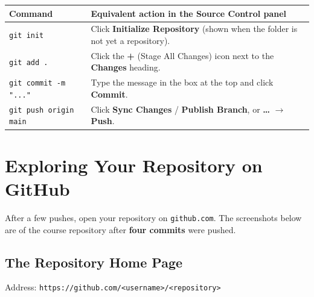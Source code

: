 \documentclass[11pt,a4paper]{article}
\newcommand{\code}[1]{\texttt{#1}}
\newcommand{\menu}[1]{\textsf{\textbf{#1}}}
\begin{document}
\begin{center}
\renewcommand{\arraystretch}{1.3}
\small
\begin{tabularx}{\linewidth}{|l|X|}
\hline
\textbf{Command} & \textbf{Equivalent action in the Source Control panel} \\ \hline
\code{git init} & Click \menu{Initialize Repository} (shown when the folder is not yet a repository). \\ \hline
\code{git add .} & Click the \menu{+} (Stage All Changes) icon next to the \textbf{Changes} heading. \\ \hline
\code{git commit -m "..."} & Type the message in the box at the top and click \menu{Commit}. \\ \hline
\code{git push origin main} & Click \menu{Sync Changes} / \menu{Publish Branch}, or \menu{\ldots} $\rightarrow$ \menu{Push}. \\ \hline
\end{tabularx}
\end{center}

\section{Exploring Your Repository on GitHub}
\label{sec:explore}

After a few pushes, open your repository on \code{github.com}. The screenshots below are of the course repository after \textbf{four commits} were pushed.

\subsection{The Repository Home Page}

Address: \code{https://github.com/<username>/<repository>}
\end{document}
